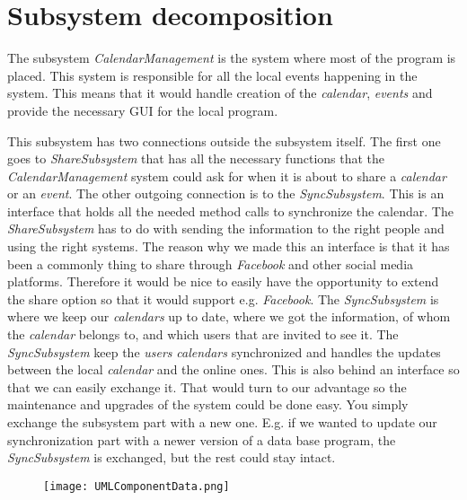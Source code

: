 \section{Subsystem decomposition}
The subsystem \textit{CalendarManagement} is the system where most of the program is placed. This system is responsible for all the local events happening in the system. This means that it would handle creation of the \textit{calendar}, \textit{events} and provide the necessary GUI for the local program. 

This subsystem has two connections outside the subsystem itself. The first one goes to \textit{ShareSubsystem} that has all the necessary functions that the \textit{CalendarManagement} system could ask for when it is about to share a \textit{calendar} or an \textit{event}. The other outgoing connection is to the \textit{SyncSubsystem}. This is an interface that holds all the needed method calls to synchronize the calendar.
\newline
\newline
The \textit{ShareSubsystem} has to do with sending the information to the right people and using the right systems. The reason why we made this an interface is that it has been a commonly thing to share through \textit{Facebook} and other social media platforms. Therefore it would be nice to easily have the opportunity to extend the share option so that it would support e.g. \textit{Facebook}. 
\newline
\newline
The \textit{SyncSubsystem} is where we keep our \textit{calendars} up to date, where we got the information, of whom the \textit{calendar} belongs to, and which users that are invited to see it. The \textit{SyncSubsystem} keep the \textit{users} \textit{calendars} synchronized and handles the updates between the local \textit{calendar} and the online ones. This is also behind an interface so that we can easily exchange it. That would turn to our advantage so the maintenance and upgrades of the system could be done easy. You simply exchange the subsystem part with a new one. E.g. if we wanted to update our synchronization part with a newer version of a data base program, the \textit{SyncSubsystem} is exchanged, but the rest could stay intact. 
\newline
\begin{figure}[h]
\centering
\texttt{[image: UMLComponentData.png]}
\label{figur:UMLComponentData}
\end{figure}